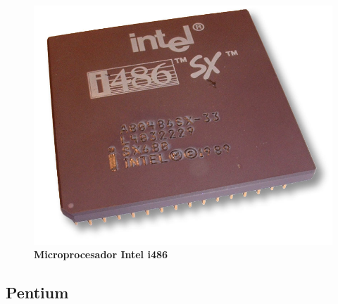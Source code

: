 \begin{figure}[htb]
	\centering
	\includegraphics[scale = 0.15]{Graphics/Intel_80486sx.jpg}
	\caption{\textbf{Microprocesador Intel i486}}
	\label{fig:21}
\end{figure}

\subsection{Pentium}


